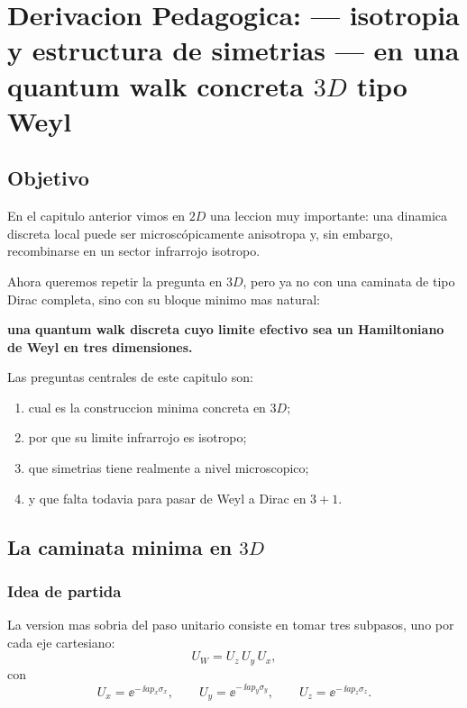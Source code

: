 \chapter{Derivacion Pedagogica: --- isotropia y estructura de simetrias --- en una quantum walk concreta \(3D\) tipo Weyl}
\label{ch:isotropia-qw-3d-weyl}







\section{Objetivo}
En el capitulo anterior vimos en \(2D\) una leccion muy importante: una dinamica discreta local puede ser microscópicamente anisotropa y, sin embargo, recombinarse en un sector infrarrojo isotropo.

Ahora queremos repetir la pregunta en \(3D\), pero ya no con una caminata de tipo Dirac completa, sino con su bloque minimo mas natural:
\begin{displayquote}
\textbf{una quantum walk discreta cuyo limite efectivo sea un Hamiltoniano de Weyl en tres dimensiones.}
\end{displayquote}

Las preguntas centrales de este capitulo son:
\begin{enumerate}[label=\arabic*.]
    \item cual es la construccion minima concreta en \(3D\);
    \item por que su limite infrarrojo es isotropo;
    \item que simetrias tiene realmente a nivel microscopico;
    \item y que falta todavia para pasar de Weyl a Dirac en \(3+1\).
\end{enumerate}

\section{La caminata minima en \(3D\)}
\subsection{Idea de partida}
La version mas sobria del paso unitario consiste en tomar tres subpasos, uno por cada eje cartesiano:
\begin{equation}
U_W = U_z\,U_y\,U_x,
\label{c09:eq:UW}
\end{equation}
con
\begin{equation}
U_x = \ee^{-\,\ii a p_x \sigma_x},
\qquad
U_y = \ee^{-\,\ii a p_y \sigma_y},
\qquad
U_z = \ee^{-\,\ii a p_z \sigma_z}.
\label{c09:eq:substeps}
\end{equation}

